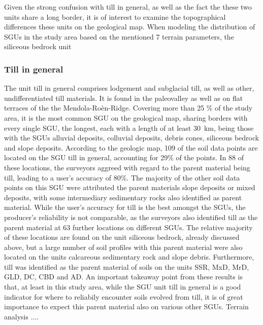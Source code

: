 \documentclass[preprint,12pt,authoryear]{elsarticle}
\begin{document}
Given the strong confusion with till in general, as well as the fact the these two units share a long border, it is of interest to examine the topographical differences these units on the geological map. When modeling the distribution of SGUs in the study area based on the mentioned 7 terrain parameters, the siliceous bedrock unit 
\subsubsection{Till in general}
The unit till in general comprises lodgement and subglacial till, as well as other, undifferentiated till materials. It is found in the paleovalley as well as on flat terraces of the the Mendola-Ro\`en-Ridge.   Covering more than 25 \% of the study area, it is the most common SGU on the geological map, sharing borders with every single SGU, the longest, each with a length of at least 30~km, being those with the SGUs alluvial deposits, colluvial deposits, debris cones, siliceous bedrock and slope deposits. According to the geologic map, 109 of the soil data points are located on the SGU till in general, accounting for 29\% of the points. In 88 of these locations, the surveyors aggreed with regard to the parent material being till, leading to a user's accuracy of 80\%. The majority of the other soil data points on this SGU were attributed the parent materials slope deposits or  mixed deposits, with some intermediary sedimentary rocks also identified as parent material. While the user's accuracy for till is the best amongst the SGUs, the producer's reliability is not comparable, as the surveyors also identified till as the parent material at 63 further locations on different SGUs. The relative majority of these locations are found on the unit siliceous bedrock, already discussed above, but a large number of soil profiles with this parent material were also located on the units calcareous sedimentary rock and slope debris. Furthermore, till was identified as the parent material of soils on the units SSR, MxD, MrD, GLD, DC, CBD and AD. An important takeaway point from these results is that, at least in this study area, while the SGU unit till in general is a good indicator for where to reliabily encounter soils evolved from till, it is of great importance to expect this  parent material also on various other SGUs. Terrain analysis ....
\end{document}
